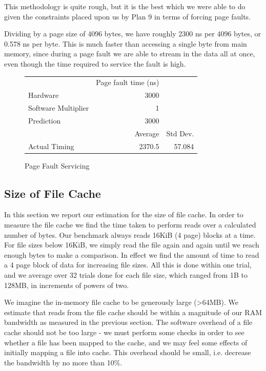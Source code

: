 \documentclass[letterpaper,twocolumn,10pt]{article}
\begin{document}
This methodology is quite rough, but it is the best which we were able to do given the constraints placed upon 
us by Plan 9 in terms of forcing page faults.

Dividing by a page size of 4096 bytes, we have roughly 2300 ns per 4096 bytes, or 0.578 ns per byte. This is much faster than accessing a single byte from main memory, since during a page fault we are able to stream in the data all at once, even though the time required to service the fault is high.

\begin{figure}
	\centering
    \begin{tabular}{l r r}
      & Page fault time (ns) \\
      Hardware & 3000\\
      Software Multiplier & 1 \\
      Prediction & $3000$ \\
                   & Average & Std Dev.\\
      Actual Timing & 2370.5 & 57.084 \\
\end{tabular}
\caption{Page Fault Servicing}
\label{tab:pagefault}
\end{figure}

\subsection{Size of File Cache}
In this section we report our estimation for the size of file cache. In order to
measure the file cache we find the time taken to perform reads over a calculated
number of bytes. Our benchmark always reads 16KiB (4 page) blocks at a time. For
file sizes below 16KiB, we simply read the file again and again until we reach
enough bytes to make a comparison. In effect we find the amount of time to read
a 4 page block of data for increasing file sizes. All this is done within one
trial, and we average over 32 trials done for each file size, which ranged
from 1B to 128MB, in increments of powers of two.

We imagine the in-memory file cache to be generously large (>64MB). We estimate
that reads from the file cache should be within a magnitude of our RAM bandwidth
as measured in the previous section. The software overhead of a file cache should
not be too large - we must perform some checks in order to see whether a file
has been mapped to the cache, and we may feel some effects of initially mapping
a file into cache. This overhead should be small, i.e. decrease the bandwidth
by no more than 10\%.
\end{document}
